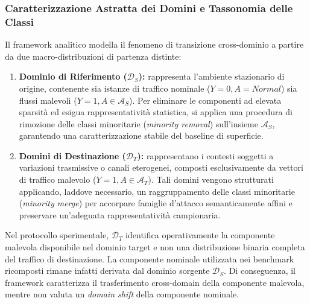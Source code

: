 \subsubsection{Caratterizzazione Astratta dei Domini e Tassonomia delle Classi}
\label{subsubsec:caratterizzazione_domini}
Il framework analitico modella il fenomeno di transizione cross-dominio a partire da due macro-distribuzioni di partenza distinte:
\begin{enumerate}
    \item \textbf{Dominio di Riferimento ($\mathcal{D}_S$):} rappresenta l'ambiente stazionario di origine, contenente sia istanze di traffico nominale ($Y = 0, A = \textit{Normal}$) sia flussi malevoli ($Y = 1, A \in \mathcal{A}_S$). Per eliminare le componenti ad elevata sparsità ed esigua rappresentatività statistica, si applica una procedura di rimozione delle classi minoritarie (\textit{minority removal}) sull'insieme $\mathcal{A}_S$, garantendo una caratterizzazione stabile del baseline di superficie.
    \item \textbf{Domini di Destinazione ($\mathcal{D}_T$):} rappresentano i contesti soggetti a variazioni trasmissive o canali eterogenei, composti esclusivamente da vettori di traffico malevolo ($Y = 1, A \in \mathcal{A}_T$). Tali domini vengono strutturati applicando, laddove necessario, un raggruppamento delle classi minoritarie (\textit{minority merge}) per accorpare famiglie d'attacco semanticamente affini e preservare un'adeguata rappresentatività campionaria.
\end{enumerate}

Nel protocollo sperimentale, $\mathcal{D}_T$ identifica operativamente la componente malevola disponibile nel dominio target e non una distribuzione binaria completa del traffico di destinazione. La componente nominale utilizzata nei benchmark ricomposti rimane infatti derivata dal dominio sorgente $\mathcal{D}_S$. Di conseguenza, il framework caratterizza il trasferimento cross-domain della componente malevola, mentre non valuta un \textit{domain shift} della componente nominale.


